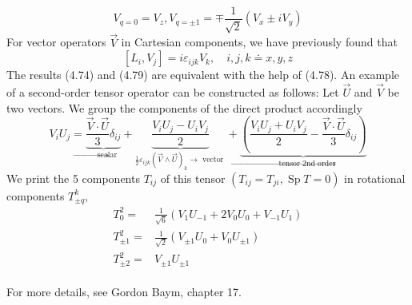 \begin{equation}
    V_{q=0}=V_{z}, V_{q=\pm 1}=\mp \frac{1}{\sqrt{2}}\left(V_{x} \pm i V_{y}\right)
    \end{equation}
For vector operators $\vec{V}$ in Cartesian components, we have previously found that
\begin{equation}
    \left[L_{i}, V_{j}\right]=i \varepsilon_{i j k} V_{k}, \quad i, j, k \doteq x, y, z
    \end{equation}
The results (4.74) and (4.79) are equivalent with the help of (4.78).
An example of a second-order tensor operator can be constructed as follows: Let $\vec{U}$ and $\vec{V}$ be two vectors. We group the components of the direct product accordingly
\begin{equation}
    V_{i} U_{j}=\underbrace{\frac{\vec{V} \cdot \vec{U}}{3} \delta_{i j}}_{\rightarrow \text { scalar }}+\underbrace{\frac{V_{i} U_{j}-U_{i} V_{j}}{2}}_{\frac{1}{2} \varepsilon_{i j k}(\vec{V} \wedge \vec{U})_{k} \rightarrow \text { vector }}+\underbrace{\left(\frac{V_{i} U_{j}+U_{i} V_{j}}{2}-\frac{\vec{V} \cdot \vec{U}}{3} \delta_{i j}\right)}_{\rightarrow \text { tensor 2nd order }}
    \end{equation}
We print the 5 components $T_{ij}$ of this tensor $(T_{ij} = T_{ji}, \operatorname{Sp}T = 0)$ in rotational components $T^k_{\pm q}$,
\begin{equation}
    \begin{aligned} 
    T_{0}^{2} =& \frac{1}{\sqrt{6}}\left(V_{1} U_{-1}+2 V_{0} U_{0}+V_{-1} U_{1}\right) \\ 
    T_{\pm 1}^{2} =& \frac{1}{\sqrt{2}}\left(V_{\pm 1} U_{0}+V_{0} U_{\pm 1}\right) \\ 
    T_{\pm 2}^{2} =& V_{\pm 1} U_{\pm 1}
    \end{aligned}
\end{equation}\\
For more details, see Gordon Baym, chapter 17.

\newpage